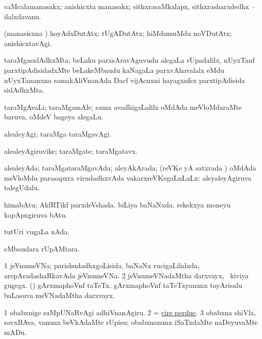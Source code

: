\bentry
{} 
\gl{\nA}
\expl{}
\bmng
caMcalamanasakx; anishicxta manasakx; sithxrasaMkalapx, sithxrasharxdedhx -- ilalxdavanu. 
\emng
\eentry

\bentry
{} 
\gl{\kirxvi}
\expl{}
\bmng
(manasisxna \vi) hoyAdxDutAtx; tUgADutAtx; hiMdumuMdu noVDutAtx; anishicxtavAgi. 
\emng
\eentry

\bentry
{} 
\gl{\nA}
\expl{}
\bmng
taraMgasidAdhxMta; beLaku parxsAravAguvudu alegaLa rUpadalilx, nUyxTanf parxtipAdisidadxMte beLakeMbaudu kaNagaLa parxvAhavalalx eMdu nUyxTananxna samakAliVnanAda Dacf vijAcnxni hayagxnfsx parxtipAdisida sidAdhxMta. 
\emng
\eentry

\bentry
{} 
\gl{\nA}
\expl{}
\bmng
taraMgAvaLi; taraMgamAle; sama avadhigaLalilx oMdAda meVloMdaraMte baruva, oMdeV bageya alegaLu. 
\emng
\eentry

\bentry
{} 
\gl{\kirxvi}
\expl{}
\bmng
alealeyAgi; taraMga taraMgavAgi. 
\emng
\eentry

\bentry
{} 
\gl{\nA}
\expl{}
\bmng
alealeyAgiruvike; taraMgate; taraMgatavx. 
\emng
\eentry

\bentry
{} 
\gl{\gu}
\bmng
alealeyAda; taraMgataraMgavAda; aleyAkArada; (reVKe yA satxrada \vi) oMdAda meVloMdu parasapxra virudadhxvAda vakarxreVKegaLuLaLx:  aleyaleyAgiruva talegUdalu. 
\emng
\eentry

\bentry
{} 
\gl{\nA}
\expl{}
\bmng
himabAtu; AkfRTikf parxdeVshada, biLiya baNaNxda, rekekxya moneyu kapApxgiruva bAtu. 
\emng
\eentry

\bentry
{} 
\gl{\nA}
\expl{}
\bmng
tutUri \mo vugaLa nAda. 
\emng
\eentry

\bentry
{} 
\gl{\akirx}
\expl{}
\bmng
{} eMbaudara rUpAMtara. 
\emng
\eentry

\bentry
{}
\gl{\nA}
\bmng
\bnum
\num{1} jeVnumeVNa; parishudadhxgoLisida, baNaNx rucigaLilalxda, arepAradashaRkavAda jeVnumeVNa. 
\num{2} jeVnumeVNadaMtha darxvayx, \udA\ kiviya gugegx. 
 (\AmA) 
\banum
{} gArxmaphoVnf taTeTx. 
 gArxmaphoVnf taTeTxyanunx tayArisalu baLasuva meVNadaMtha darxvayx. 
\eanum
\numie
\enum
\emng

\noindent 
\gl{\pagu}
\expl{}
\bmng
\bnum
\num{1}  obabxnige saMpUNaRvAgi adhiVnanAgiru. 
\num{2}  = \hyperref{kandict_c.pdf}{C}{cire perdue}{cire perdue}. 
\num{3}  obabxna shiVla, savxBAva, \mo vanunx beVkAdaMte rUpisu; obabxnanunx iSaTxdaMte naDeyuvaMte mADu. 
\enum
\emng
\eentry

